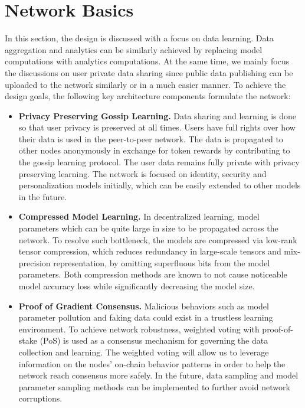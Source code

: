 \documentclass[11pt,letterpaper]{article}
\begin{document}
\section{Network Basics}
In this section, the design is discussed with a focus on data learning. Data aggregation and analytics can be similarly achieved by replacing model computations with analytics computations. At the same time, we mainly focus the discussions on user private data sharing since public data publishing can be uploaded to the network similarly or in a much easier manner.
To achieve the design goals, the following key architecture components formulate the network:
\begin{itemize}
  \item \textbf{Privacy Preserving Gossip Learning.} Data sharing and learning is done so that user privacy is preserved at all times. Users have full rights over how their data is used in the peer-to-peer network. The data is propagated to other nodes anonymously in exchange for token rewards by contributing to the gossip learning protocol. The user data remains fully private with privacy preserving learning. The network is focused on identity, security and personalization models initially, which can be easily extended to other models in the future.
  \item \textbf{Compressed Model Learning.}
  In decentralized learning, model parameters which can be quite large in size to be propagated across the network. To resolve such bottleneck, the models are compressed via low-rank tensor compression, which reduces redundancy in large-scale tensors and mix-precision representation, by omitting superfluous bits from the model parameters. Both compression methods are known to not cause noticeable model accuracy loss while significantly decreasing the model size.
  \item \textbf{Proof of Gradient Consensus.} Malicious behaviors such as model parameter pollution and faking data could exist in a trustless learning environment. To achieve network robustness, weighted voting with proof-of-stake (PoS) is used as a consensus mechanism for governing the data collection and learning. The weighted voting will allow us to leverage information on the nodes' on-chain behavior patterns in order to help the network reach consensus more safely. In the future, data sampling and model parameter sampling methods can be implemented to further avoid network corruptions.
\end{itemize}
\end{document}
